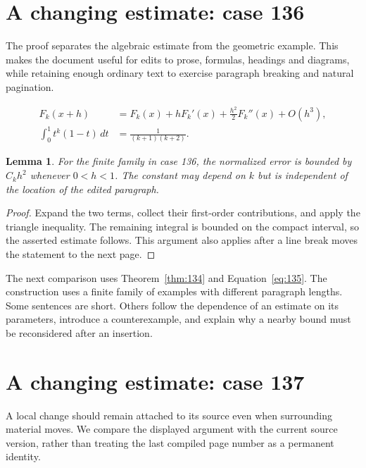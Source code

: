 \documentclass[a4paper,10pt]{article}
\newtheorem{lemma}[theorem]{Lemma}
\begin{document}
\lipsum[23]

\section{A changing estimate: case 136}\label{unit:135}
The proof separates the algebraic estimate from the geometric example. This makes the document useful for edits to prose, formulas, headings and diagrams, while retaining enough ordinary text to exercise paragraph breaking and natural pagination.

\lipsum[16-17]
\begin{align}\label{eq:135}
 F_k(x+h)&=F_k(x)+hF_k'(x)+\frac{h^2}{2}F_k''(x)+O(h^3),\\
 \int_0^1 t^k(1-t)\,dt&=\frac{1}{(k+1)(k+2)}.
\end{align}
\begin{lemma}\label{thm:135}
For the finite family in case 136, the normalized error is bounded by $C_k h^2$ whenever $0<h<1$. The constant may depend on $k$ but is independent of the location of the edited paragraph.
\end{lemma}
\begin{proof}
Expand the two terms, collect their first-order contributions, and apply the
triangle inequality. The remaining integral is bounded on the compact interval,
so the asserted estimate follows. This argument also applies after a line break
moves the statement to the next page.
\end{proof}
\begin{center}
\end{center}
The next comparison uses Theorem~\ref{thm:134} and Equation~\ref{eq:135}. The construction uses a finite family of examples with different paragraph lengths. Some sentences are short. Others follow the dependence of an estimate on its parameters, introduce a counterexample, and explain why a nearby bound must be reconsidered after an insertion.

\lipsum[3]

\section{A changing estimate: case 137}\label{unit:136}
A local change should remain attached to its source even when surrounding material moves. We compare the displayed argument with the current source version, rather than treating the last compiled page number as a permanent identity.
\end{document}
